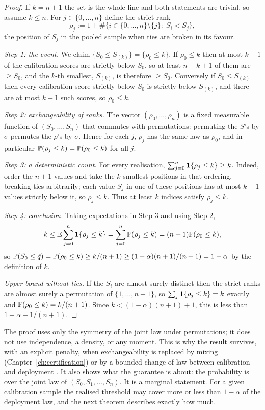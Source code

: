\documentclass[../../../main.tex]{subfiles}
\begin{document}
\begin{proof}
If $k=n+1$ the set is the whole line and both statements are trivial, so assume $k\le n$. For $j\in\{0,\dots,n\}$ define the strict rank
\[
\rho_j:=1+\#\{i\in\{0,\dots,n\}\setminus\{j\}:\;S_i<S_j\},
\]
the position of $S_j$ in the pooled sample when ties are broken in its favour.

\emph{Step 1: the event.} We claim $\{S_0\le S_{(k)}\}=\{\rho_0\le k\}$. If $\rho_0\le k$ then at most $k-1$ of the calibration scores are strictly below $S_0$, so at least $n-k+1$ of them are $\ge S_0$, and the $k$-th smallest, $S_{(k)}$, is therefore $\ge S_0$. Conversely if $S_0\le S_{(k)}$ then every calibration score strictly below $S_0$ is strictly below $S_{(k)}$, and there are at most $k-1$ such scores, so $\rho_0\le k$.

\emph{Step 2: exchangeability of ranks.} The vector $(\rho_0,\dots,\rho_n)$ is a fixed measurable function of $(S_0,\dots,S_n)$ that commutes with permutations: permuting the $S$'s by $\sigma$ permutes the $\rho$'s by $\sigma$. Hence for each $j$, $\rho_j$ has the same law as $\rho_0$, and in particular $\mathbb{P}(\rho_j\le k)=\mathbb{P}(\rho_0\le k)$ for all $j$.

\emph{Step 3: a deterministic count.} For every realisation, $\sum_{j=0}^n\mathbf{1}\{\rho_j\le k\}\ge k$. Indeed, order the $n+1$ values and take the $k$ smallest positions in that ordering, breaking ties arbitrarily; each value $S_j$ in one of these positions has at most $k-1$ values strictly below it, so $\rho_j\le k$. Thus at least $k$ indices satisfy $\rho_j\le k$.

\emph{Step 4: conclusion.} Taking expectations in Step 3 and using Step 2,
\[
k\le\mathbb{E}\sum_{j=0}^n\mathbf{1}\{\rho_j\le k\}=\sum_{j=0}^n\mathbb{P}(\rho_j\le k)=(n+1)\mathbb{P}(\rho_0\le k),
\]
so $\mathbb{P}(S_0\le\hat q)=\mathbb{P}(\rho_0\le k)\ge k/(n+1)\ge(1-\alpha)(n+1)/(n+1)=1-\alpha$ by the definition of $k$.

\emph{Upper bound without ties.} If the $S_i$ are almost surely distinct then the strict ranks are almost surely a permutation of $\{1,\dots,n+1\}$, so $\sum_j\mathbf{1}\{\rho_j\le k\}=k$ exactly and $\mathbb{P}(\rho_0\le k)=k/(n+1)$. Since $k<(1-\alpha)(n+1)+1$, this is less than $1-\alpha+1/(n+1)$.
\end{proof}

The proof uses only the symmetry of the joint law under permutations; it does not use independence, a density, or any moment. This is why the result survives, with an explicit penalty, when exchangeability is replaced by mixing (Chapter~\ref{ch:certification}) or by a bounded change of law between calibration and deployment \cite{barber2023}. It also shows what the guarantee is about: the probability is over the joint law of $(S_0,S_1,\dots,S_n)$. It is a marginal statement. For a given calibration sample the realised threshold may cover more or less than $1-\alpha$ of the deployment law, and the next theorem describes exactly how much.
\end{document}
